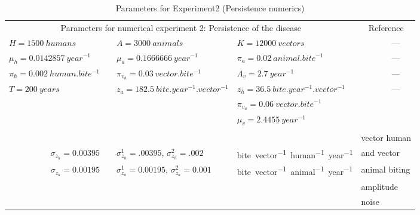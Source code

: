 \begin{table}[p]
	\centering
	\caption{Parameters for Experiment2 (Persistence numerics)}
	\label{tbl:persistence_parameters}
	\begin{tabular}{@{}lllllc@{}}
		\toprule
		\multicolumn{4}{c}{%
			Parameters for numerical experiment 2: Persistence of the disease %
			} & \multicolumn{2}{c}{Reference}
		\\
		\cmidrule{1-4}
		$H=\num{1500} ~\si{humans}$	&&	$A=\num{3000} ~\si{animals}$	& 
		$K=\num{12000} ~\si{vectors}$&
		& ---
		\\
		$\mu_h=\num{0.0142857}~\si{year^{-1}}$	&&$\mu_a=0.1666666 
		~\si{year^{-1}}$	
		& $\pi_{a} = \num{0.02} ~\si{animal.bite^{-1}}$
		&																		& ---
		\\
		$\pi_{h} = \num{0.002} ~\si{human.bite^{-1}}$		&&
		$\pi_{v_h} = \num{0.03} ~\si{vector.bite^{-1}}$	&
		$\Lambda_v = 2.7 ~\si{year^{-1}}$
		&& ---%
		\\
			$T=200 ~\si{years}$&&
			$z_a = 182.5~\si{bite.year^{-1}.vector^{-1}}$		&
			$z_h = 36.5 ~\si{bite.year^{-1}.vector^{-1}}$&&	---
		\\
		&&& $\pi_{v_a} = \num{0.06} ~\si{vector.bite^{-1}}$ &&	\cite{Cohen2001}
		\\
		&&& $\mu_v=2.4455 ~\si{year^{-1}}$ && \cite{Rabinovich1972}
		\\
		\multicolumn{1}{c}{
			\Cref{fig:persistence_path,fig:mean_persistence}
		}
		&&
		\multicolumn{1}{c}{
			\Cref{fig:noise_variance_reduction}
		}
		&&
		\\
		\cmidrule{1-1}
		\cmidrule{3-3}
		&&&&
		\multicolumn{2}{l}{vector human}		\\
		\multicolumn{1}{r}{%
			$\sigma_{z_h} = \num{0.00395}$
			}
		&&
		\multicolumn{1}{l}{%
			$\sigma_{z_h}^1 = \num{.00395}$, \quad
			$\sigma_{z_h}^2 = \num{.002}$%
			
		}
		&
		\si{bite.vector^{-1}.human^{-1}.year^{-1}}
		&
		\multicolumn{2}{l}{and vector}
		\\
		\multicolumn{1}{r}{
			$\sigma_{z_a} = \num{0.00195}$
		}
		&&
		\multicolumn{1}{l}{
			$\sigma_{z_a}^1 = \num{0.00195}$, \quad
			$\sigma_{z_a}^2 = \num{0.001}$%
		}
		&
		\si{bite.vector^{-1}.animal^{-1}.year^{-1}}
		&
		\multicolumn{2}{l}{animal biting}\\
		&&&&
		\multicolumn{2}{l}{amplitude}\\
		&&&&
		\multicolumn{2}{l}{noise}\\
		\bottomrule
	\end{tabular}
\end{table}
